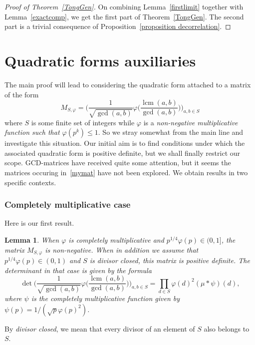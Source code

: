 \documentclass[a4paper,12pt, reqn0]{amsart}
\newtheorem{lemma}{Lemma}[section]
\theoremstyle{remark}
\DeclareMathOperator{\lcm}{lcm}
\begin{document}
\begin{proof}[Proof of Theorem~\ref{TongGen}]
  On combining Lemma~\ref{firstlimit} together with
  Lemma~\ref{exactcomp}, we get the first part of
  Theorem~\ref{TongGen}. The second part is a trivial consequence of
  Proposition~\ref{proposition decorrelation}.
\end{proof}


\section{Quadratic forms auxiliaries}\label{section quadratic}

The main proof will lead to considering the quadratic form attached
to a matrix of the form
\begin{equation}
  \label{mymat}
  M_{S, \varphi}=\biggl(\frac{1}{\sqrt{\gcd(a,b)}}
  \varphi\biggl(\frac{\lcm(a,b)}{\gcd(a,b)}\biggr)
  \biggr)_{a,b\in S}
\end{equation}
where $S$ is some finite set of integers while $\varphi$ is a
\emph{non-negative multiplicative function such that $\varphi(p^k)\le 1$}.
So we stray somewhat from the main line and investigate this
situation.  Our initial aim is to find conditions under which the
associated quadratic form is positive definite, but we shall finally
restrict our scope.  GCD-matrices have received quite some attention,
but it seems the matrices occuring in~\eqref{mymat} have not been
explored.  We obtain results in two specific contexts.
\subsubsection*{Completely multiplicative case}
Here is our first result.
\begin{lemma}
  \label{CM}
  When $\varphi$ is completely multiplicative and $p^{1/4}\varphi(p)\in(0,1]$, the matrix $M_{S, \varphi}$ is
  non-negative. When in addition we assume that $p^{1/4}\varphi(p)\in(0,1)$ and $S$ is divisor closed, this matrix
  is positive definite. The determinant in that case is given by the
  formula
  \begin{equation*}
    \det
    \biggl(\frac{1}{\sqrt{\gcd(a,b)}}
    \varphi\biggl(\frac{\lcm(a,b)}{\gcd(a,b)}\biggr)
    \biggr)_{a,b\in S}
    =\prod_{d\in S}\varphi(d)^2(\mu\ast \psi)(d),
  \end{equation*}
  where $\psi$ is the completely multiplicative function given by $\psi(p)=1/(\sqrt{p}\varphi(p)^2)$.
\end{lemma}
By \emph{divisor closed}, we mean that every divisor of an element of
$S$ also belongs to~$S$.
\end{document}
